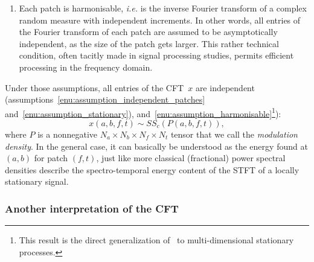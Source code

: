 {{\begin{enumerate}[leftmargin=0cm,itemindent=.5cm,labelwidth=\itemindent,labelsep=0cm,align=left]
\item Each patch is harmonisable, \emph{i.e.} is the inverse Fourier
transform of a complex random measure with independent increments.
In other words, all entries of the Fourier transform of each patch
are assumed to be asymptotically independent, as the size of the patch
gets larger. This rather technical condition, often tacitly made in
signal processing studies, permits efficient processing in the frequency
domain.\label{enu:assumption_harmonisable}
\end{enumerate}

Under those assumptions, all entries of the CFT~$x$ are independent
(assumptions~\ref{enu:assumption_independent_patches} and~\ref{enu:assumption_stationary}),
and~\ref{enu:assumption_harmonisable}\footnote{This result is the direct generalization
of~\cite[th. 6.5.1]{samoradnitsky94} to multi-dimensional stationary processes.}):
\begin{equation}
x\left(a,b,f,t\right)\sim S S_{c}\left(P\left(a,b,f,t\right)\right),\label{eq:SaS_model}
\end{equation}
where $P$ is a nonnegative $N_{a}\times N_{b}\times N_{f}\times N_{t}$
tensor that we call the \emph{modulation density}. In
the general case, it can basically be understood as the energy found at $\left(a,b\right)$ for patch
$\left(f,t\right)$, just like more classical (fractional) power spectral
densities describe the spectro-temporal energy content of the STFT
of a locally stationary signal.

\subsubsection{Another interpretation of the CFT}

\label{sub:interpretation}

}}

